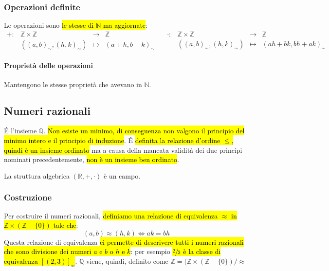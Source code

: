 \subsubsection{Operazioni definite} 
Le operazioni sono \hl{le stesse di $\mathbb{N}$ ma aggiornate}:
\[
    \begin{array}{cccc}
        +: &\mathbb{Z} \times \mathbb{Z} &\to &\mathbb{Z} \\
        &((a, b)_{\sim}, (h,k)_{\sim}) &\mapsto & (a+h, b+k)_{\sim}
    \end{array} \quad
    \begin{array}{cccc}
        \cdot: &\mathbb{Z} \times \mathbb{Z} &\to &\mathbb{Z} \\
        &((a, b)_{\sim}, (h,k)_{\sim}) &\mapsto & (ah + bk, bh + ak)_{\sim}
    \end{array}
\]

\paragraph{Proprietà delle operazioni} Mantengono le stesse proprietà che 
avevano in $\mathbb{N}$.

\subsection{Numeri razionali}
\'E l'insieme $\mathbb{Q}$. \hl{Non esiste un minimo, di conseguenza non valgono 
il principio del minimo intero e il principio di induzione}. \'E \hl{definita la
relazione d'ordine $\leq$, quindi è un insieme ordinato} ma a causa della
mancata validità dei due principi nominati precedentemente, \hl{non è un insieme
ben ordinato}.

La struttura algebrica $(\mathbb{R}, +, \cdot)$ è un campo.

\subsubsection{Costruzione}
Per costruire il numeri razionali, \hl{definiamo una relazione di equivalenza 
$\approx$ in $\mathbb{Z} \times (\mathbb{Z} - \{0\})$ tale che}:
\[ (a,b) \approx (h,k) \iff ak=bh \]
Questa relazione di equivalenza \hl{ci permette di descrivere tutti i numeri razionali
che sono divisione dei numeri $a$ e $b$ o $h$ e $k$}: per esempio \hl{$\sfrac{2}{3}$
è la classe di equivalenza $[(2,3)]_{\approx}$}. $\mathbb{Q}$ viene, quindi, 
definito come $\mathbb{Z} = (\mathbb{Z} \times (\mathbb{Z} - \{0\}) / \approx$

